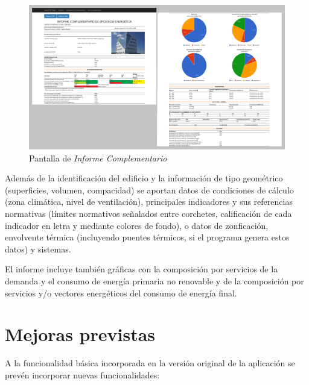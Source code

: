 \documentclass[10pt,notitlepage,oneside,a4paper]{article}
\begin{document}
\begin{figure}[H]
  \centering
  \includegraphics[width=\textwidth]{imagenes/pantalla_informecomplementario_trozos}  
  \caption{Pantalla de \textit{Informe Complementario}}
  \label{fig:picomplementario}
\end{figure}

Además de la identificación del edificio y la información de tipo geométrico (superficies, volumen, compacidad) se aportan datos de condiciones de cálculo (zona climática, nivel de ventilación), principales indicadores y sus referencias normativas (límites normativos señalados entre corchetes, calificación de cada indicador en letra y mediante colores de fondo), o datos de zonficación, envolvente térmica (incluyendo puentes térmicos, si el programa genera estos datos) y sistemas.

El informe incluye también gráficas con la composición por servicios de la demanda y el consumo de energía primaria no renovable y de la composición por servicios y/o vectores energéticos del consumo de energía final.

\section{Mejoras previstas}

A la funcionalidad básica incorporada en la versión original de la aplicación se prevén incorporar nuevas funcionalidades:
\end{document}
